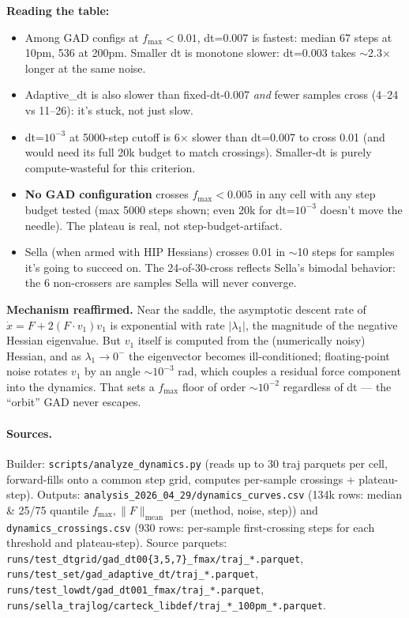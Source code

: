\documentclass[11pt]{article}
\begin{document}
\textbf{Reading the table:}
\begin{itemize}[leftmargin=1.5em]
\item Among GAD configs at $f_{\max}{<}0.01$, dt=0.007 is fastest:
  median 67 steps at 10pm, 536 at 200pm. Smaller dt is monotone slower:
  dt=0.003 takes $\sim$2.3$\times$ longer at the same noise.
\item Adaptive\_dt is also slower than fixed-dt-0.007 \emph{and} fewer
  samples cross (4--24 vs 11--26): it's stuck, not just slow.
\item dt=$10^{-3}$ at 5000-step cutoff is 6$\times$ slower than dt=0.007
  to cross 0.01 (and would need its full 20k budget to match crossings).
  Smaller-dt is purely compute-wasteful for this criterion.
\item \textbf{No GAD configuration} crosses $f_{\max}{<}0.005$ in any cell
  with any step budget tested (max 5000 steps shown; even 20k for
  dt=$10^{-3}$ doesn't move the needle). The plateau is real, not
  step-budget-artifact.
\item Sella (when armed with HIP Hessians) crosses 0.01 in $\sim$10
  steps for samples it's going to succeed on. The 24-of-30-cross
  reflects Sella's bimodal behavior: the 6 non-crossers are samples
  Sella will never converge.
\end{itemize}

\textbf{Mechanism reaffirmed.} Near the saddle, the asymptotic descent
rate of $\dot x = F + 2(F\!\cdot\!v_1)v_1$ is exponential with rate
$|\lambda_1|$, the magnitude of the negative Hessian eigenvalue.
But $v_1$ itself is computed from the (numerically noisy) Hessian,
and as $\lambda_1{\to}0^-$ the eigenvector becomes ill-conditioned;
floating-point noise rotates $v_1$ by an angle $\sim 10^{-3}$ rad,
which couples a residual force component into the dynamics. That sets
a $f_{\max}$ floor of order $\sim 10^{-2}$ regardless of dt — the
``orbit'' GAD never escapes.

\paragraph{Sources.} Builder: \texttt{scripts/analyze\_dynamics.py}
(reads up to 30 traj parquets per cell, forward-fills onto a common
step grid, computes per-sample crossings + plateau-step). Outputs:
\texttt{analysis\_2026\_04\_29/dynamics\_curves.csv} (134k rows: median
\& 25/75 quantile $f_{\max}, \|F\|_{\text{mean}}$ per (method, noise,
step)) and \texttt{dynamics\_crossings.csv} (930 rows: per-sample
first-crossing steps for each threshold and plateau-step).
Source parquets:
\texttt{runs/test\_dtgrid/gad\_dt00\{3,5,7\}\_fmax/traj\_*.parquet},
\texttt{runs/test\_set/gad\_adaptive\_dt/traj\_*.parquet},
\texttt{runs/test\_lowdt/gad\_dt001\_fmax/traj\_*.parquet},
\texttt{runs/sella\_trajlog/carteck\_libdef/traj\_*\_100pm\_*.parquet}.
\end{document}
